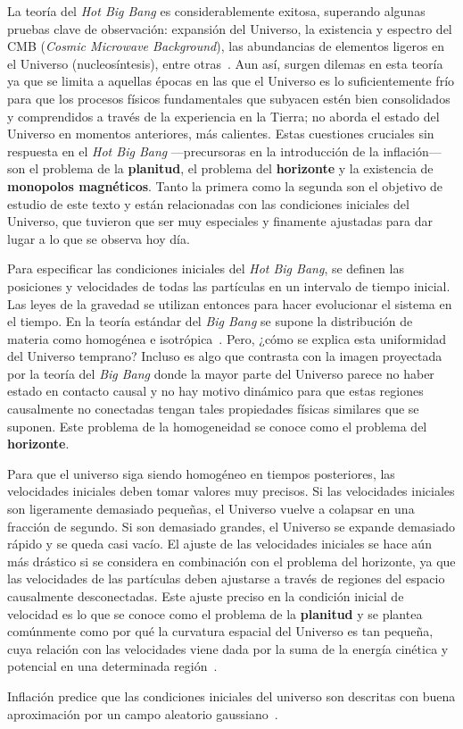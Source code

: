 La teoría del \textit{Hot Big Bang} es considerablemente exitosa, superando algunas pruebas clave de observación: expansión del Universo, la existencia y espectro del CMB (\textit{Cosmic Microwave Background}), las abundancias de elementos ligeros en el Universo (nucleosíntesis), entre otras~\cite{liddle1998introduction}. Aun así, surgen dilemas en esta teoría ya que se limita a aquellas épocas en las que el Universo es lo suficientemente frío para que los procesos físicos fundamentales que subyacen estén bien consolidados y comprendidos a través de la experiencia en la Tierra; no aborda el estado del Universo en momentos anteriores, más calientes.
\newpage
Estas cuestiones cruciales sin respuesta en el \textit{Hot Big Bang} ---precursoras en la introducción de la inflación--- son el problema de la \textbf{planitud}, el problema del \textbf{horizonte} y la existencia de \textbf{monopolos magnéticos}. Tanto la primera como la segunda son el objetivo de estudio de este texto y están relacionadas con las condiciones iniciales del Universo, que tuvieron que ser muy especiales y finamente ajustadas para dar lugar a lo que se observa hoy día.

Para especificar las condiciones iniciales del \textit{Hot Big Bang}, se definen las posiciones y velocidades de todas las partículas en un intervalo de tiempo inicial. Las leyes de la gravedad se utilizan entonces para hacer evolucionar el sistema en el tiempo. En la teoría estándar del \textit{Big Bang} se supone la distribución de materia como homogénea e isotrópica~\cite{baumann2022cosmology}. Pero, ¿cómo se explica esta uniformidad del Universo temprano? Incluso es algo que contrasta con la imagen proyectada por la teoría del \textit{Big Bang} donde la mayor parte del Universo parece no haber estado en contacto causal y no hay motivo dinámico para que estas regiones causalmente no conectadas tengan tales propiedades físicas similares que se suponen. Este problema de la homogeneidad se conoce como el problema del \textbf{horizonte}.

Para que el universo siga siendo homogéneo en tiempos posteriores, las velocidades iniciales deben tomar valores muy precisos. Si las velocidades iniciales son ligeramente demasiado pequeñas, el Universo vuelve a colapsar en una fracción de segundo. Si son demasiado grandes, el Universo se expande demasiado rápido y se queda casi vacío. El ajuste de las velocidades iniciales se hace aún más drástico si se considera en combinación con el problema del horizonte, ya que las velocidades de las partículas deben ajustarse a través de regiones del espacio causalmente desconectadas. Este ajuste preciso en la condición inicial de velocidad es lo que se conoce como el problema de la \textbf{planitud} y se plantea comúnmente como por qué la curvatura espacial del Universo es tan pequeña, cuya relación con las velocidades viene dada por la suma de la energía cinética y potencial en una determinada región~\cite{baumann2022cosmology}.

Inflación predice que las condiciones iniciales del universo son descritas con buena aproximación por un campo aleatorio gaussiano~\cite{baumann2022cosmology,dodelson2020modern}.